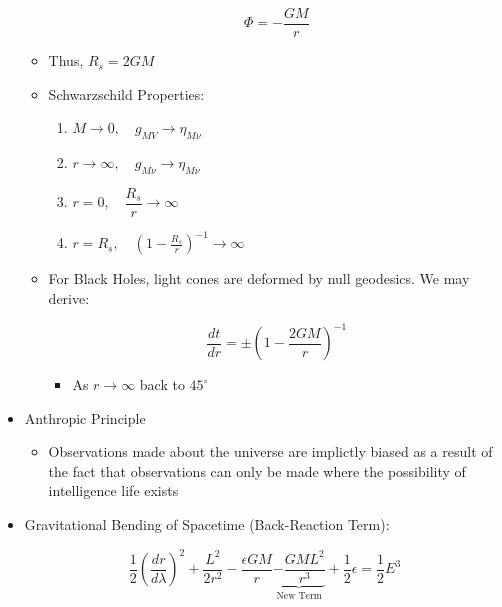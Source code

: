 \begin{itemize}
\begin{itemize}
        $$\Phi=-\frac{GM}{r}$$

      \item Thus, $R_s=2GM$

      \item Schwarzschild Properties:

        \begin{enumerate}

          \item $M\to0,\quad g_{MV}\to\eta_{M\nu}$

          \item $r\to\infty,\quad g_{M\nu}\to\eta_{M\nu}$

          \item $r=0,\quad \dfrac{R_s}{r}\to\infty$

          \item $r=R_s,\quad \left( 1-\frac{R_s}{r} \right)^{-1}\to\infty$

        \end{enumerate}

      \item For Black Holes, light cones are deformed by null geodesics. We may derive:

        $$\frac{dt}{dr}=\pm\left( 1-\frac{2GM}{r} \right)^{-1}$$

        \begin{itemize}

          \item As $r\to\infty$ back to $45^{\circ}$

        \end{itemize}

    \end{itemize}

  \item Anthropic Principle

    \begin{itemize}

      \item Observations made about the universe are implictly biased as a result of the fact that observations can only be made where the possibility of intelligence life exists

    \end{itemize}

  \item Gravitational Bending of Spacetime (Back-Reaction Term):

    $$\frac{1}{2}\left( \frac{dr}{d\lambda} \right)^2+\frac{L^2}{2r^2}-\frac{\epsilon GM}{r}\underbrace{-\frac{GML^2}{r^3}}_{\text{New Term}}+\frac{1}{2}\epsilon=\frac{1}{2}E^3$$


\end{itemize}
